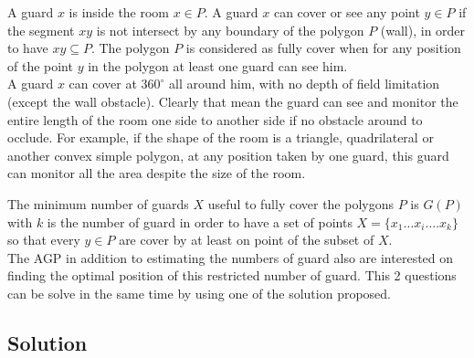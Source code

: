 A guard $x$ is inside the room $x \in P$. A guard $x$ can cover or see any point $y \in P$ if the segment $xy$ is not intersect by any boundary of the polygon $P$ (wall), in order to have $ xy \subseteq P$.
The polygon $P$ is considered as fully cover when for any position of the point $y$ in the polygon at least one guard can see him.\\
A guard $x$ can cover at $360^\circ$ all around him, with no depth of field limitation (except the wall obstacle). Clearly that mean the guard can see and monitor the entire length of the room one side to another side if no obstacle around to occlude. For example, if the shape of the room is a triangle, quadrilateral or another convex simple polygon, at any position taken by one guard, this guard can monitor all the area despite the size of the room. 

The minimum number of guards $X$ useful to fully cover the polygons $P$ is $G(P)$ with $k$ is the number of guard in order to have a set of points $X=\{x_1…x_i…. x_k\}$ so that every $y\in P$  are cover by at least on point of the subset of $X$. \\
The AGP  in addition  to estimating the numbers of guard also are interested on finding the optimal position of this  restricted number of guard. 
This 2 questions can be solve in the same time by using one of the solution proposed.


	\subsection{Solution }
	
